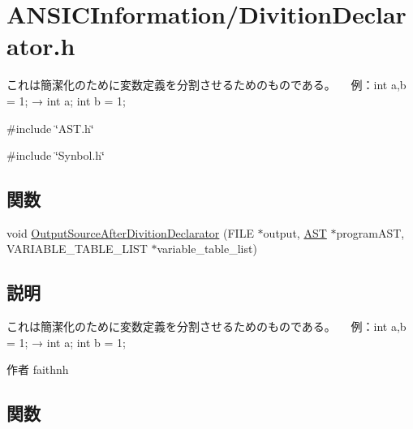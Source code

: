 \section{ANSICInformation/DivitionDeclarator.h}
\label{DivitionDeclarator_8h}


これは簡潔化のために変数定義を分割させるためのものである。 　例：int a,b = 1; → int a; int b = 1;  


{\ttfamily \#include \char`\"{}AST.h\char`\"{}}\par
{\ttfamily \#include \char`\"{}Synbol.h\char`\"{}}\par
\subsection*{関数}
\begin{DoxyCompactItemize}
\item 
void \hyperlink{DivitionDeclarator_8h_a837cc79335c63eb0a21e7ead3516b06a}{OutputSourceAfterDivitionDeclarator} (FILE $\ast$output, \hyperlink{structabstract__syntax__tree}{AST} $\ast$programAST, VARIABLE\_\-TABLE\_\-LIST $\ast$variable\_\-table\_\-list)
\end{DoxyCompactItemize}


\subsection{説明}
これは簡潔化のために変数定義を分割させるためのものである。 　例：int a,b = 1; → int a; int b = 1; \begin{DoxyAuthor}{作者}
faithnh 
\end{DoxyAuthor}


\subsection{関数}
